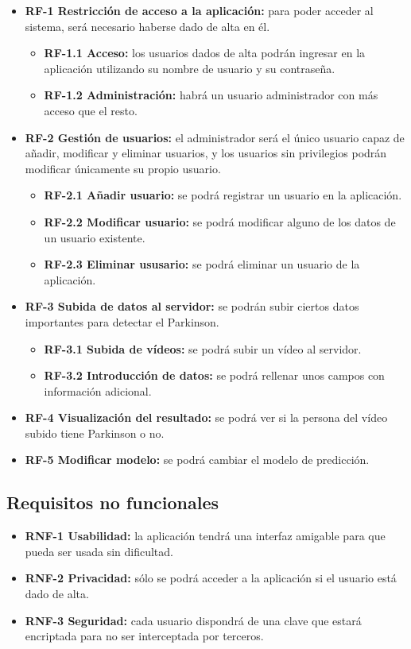 \begin{itemize}
	\item \textbf{RF-1 Restricción de acceso a la aplicación:} para poder acceder al sistema, será necesario haberse dado de alta en él.
	\begin{itemize}
		\item \textbf{RF-1.1 Acceso:} los usuarios dados de alta podrán ingresar en la aplicación utilizando su nombre de usuario y su contraseña.
		\item \textbf{RF-1.2 Administración:} habrá un usuario administrador con más acceso que el resto.
	\end{itemize}
	\item \textbf{RF-2 Gestión de usuarios:} el administrador será el único usuario capaz de añadir, modificar y eliminar usuarios, y los usuarios sin privilegios podrán modificar únicamente su propio usuario.
	\begin{itemize}
		\item \textbf{RF-2.1 Añadir usuario:} se podrá registrar un usuario en la aplicación.
		\item \textbf{RF-2.2 Modificar usuario:} se podrá modificar alguno de los datos de un usuario existente.
		\item \textbf{RF-2.3 Eliminar ususario:} se podrá eliminar un usuario de la aplicación.
	\end{itemize}
	\item \textbf{RF-3 Subida de datos al servidor:} se podrán subir ciertos datos importantes para detectar el Parkinson.
	\begin{itemize}
		\item \textbf{RF-3.1 Subida de vídeos:} se podrá subir un vídeo al servidor.
		\item \textbf{RF-3.2 Introducción de datos:} se podrá rellenar unos campos con información adicional.
	\end{itemize}
	\item \textbf{RF-4 Visualización del resultado:} se podrá ver si la persona del vídeo subido tiene Parkinson o no.
	\item \textbf{RF-5 Modificar modelo:} se podrá cambiar el modelo de predicción. 
\end{itemize}

\subsection{Requisitos no funcionales}
\begin{itemize}
	\item \textbf{RNF-1 Usabilidad:} la aplicación tendrá una interfaz amigable para que pueda ser usada sin dificultad.
	\item \textbf{RNF-2 Privacidad:} sólo se podrá acceder a la aplicación si el usuario está dado de alta.
	\item \textbf{RNF-3 Seguridad:} cada usuario dispondrá de una clave que estará encriptada para no ser interceptada por terceros.
	
\end{itemize}

